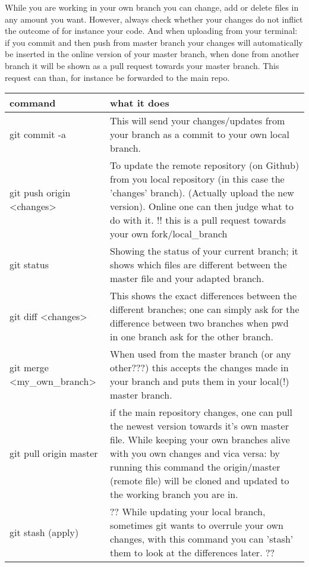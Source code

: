 While you are working in your own branch you can change, add or delete files in any amount you want. However, always check whether your changes do not inflict the outcome of for instance your code. And when uploading from your terminal: if you commit and then push from master branch your changes will automatically be inserted in the online version of your master branch, when done from another branch it will be shown as a pull request towards your master branch. This request can than, for instance be forwarded to the main repo.\\

\begin{center}
\begin{tabular}{p{6cm}|p{9cm}}
\textbf{command} &  \textbf{what it does} \\
\hline
  git commit -a & This will send your changes/updates from your branch as a commit to your own local branch. \\
  git push origin \textless changes\textgreater & To update the remote repository (on Github) from you local repository (in this case the 'changes' branch). (Actually upload the new version). Online one can then judge what to do with it. !! this is a pull request towards your own fork/local\_branch \\ 
  git status & Showing the status of your current branch; it shows which files are different between the master file and your adapted branch. \\
  git diff \textless changes\textgreater& This shows the exact differences between the different branches; one can simply ask for the difference between two branches when pwd in one branch ask for the other branch. \\ 
  git merge \textless my\_own\_branch\textgreater & When used from the master branch (or any other???) this accepts the changes made in your branch and puts them in your local(!) master branch. \\ 
  git pull origin master & if the main repository changes, one can pull the newest version towards it's own master file. While keeping your own branches alive with you own changes and vica versa: by running this command the origin/master (remote file) will be cloned and updated to the working branch you are in. \\
  git stash (apply) & ?? While updating your local branch, sometimes git wants to overrule your own changes, with this command you can 'stash' them to look at the differences later. ?? \\
\end{tabular}
\end{center}



